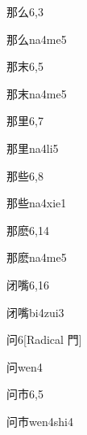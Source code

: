 \begin{entry}{那么}{6,3}
  \begin{phonetics}{那么}{na4me5}
  \end{phonetics}
\end{entry}

\begin{entry}{那末}{6,5}
  \begin{phonetics}{那末}{na4me5}
  \end{phonetics}
\end{entry}

\begin{entry}{那里}{6,7}
  \begin{phonetics}{那里}{na4li5}
  \end{phonetics}
\end{entry}

\begin{entry}{那些}{6,8}
  \begin{phonetics}{那些}{na4xie1}
  \end{phonetics}
\end{entry}

\begin{entry}{那麽}{6,14}
  \begin{phonetics}{那麽}{na4me5}
  \end{phonetics}
\end{entry}

\begin{entry}{闭嘴}{6,16}
  \begin{phonetics}{闭嘴}{bi4zui3}
  \end{phonetics}
\end{entry}

\begin{entry}{问}{6}[Radical 門]
  \begin{phonetics}{问}{wen4}
  \end{phonetics}
\end{entry}

\begin{entry}{问市}{6,5}
  \begin{phonetics}{问市}{wen4shi4}
  \end{phonetics}
\end{entry}

